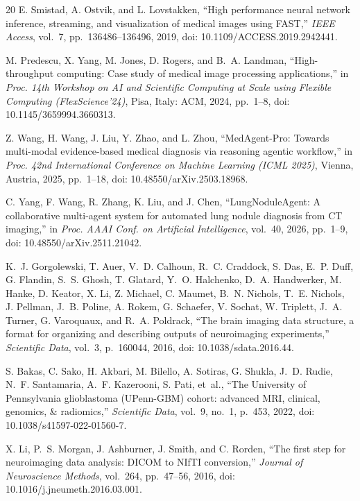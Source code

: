 \documentclass[conference]{IEEEtran}
\begin{document}
\begin{thebibliography}{20}
 E. Smistad, A. Ostvik, and L. Lovstakken, ``High performance neural network inference, streaming, and visualization of medical images using FAST,'' \textit{IEEE Access}, vol.~7, pp.~136486--136496, 2019, doi: 10.1109/ACCESS.2019.2942441.

 M. Predescu, X. Yang, M. Jones, D. Rogers, and B.~A. Landman, ``High-throughput computing: Case study of medical image processing applications,'' in \textit{Proc. 14th Workshop on AI and Scientific Computing at Scale using Flexible Computing (FlexScience'24)}, Pisa, Italy: ACM, 2024, pp.~1--8, doi: 10.1145/3659994.3660313.

 Z. Wang, H. Wang, J. Liu, Y. Zhao, and L. Zhou, ``MedAgent-Pro: Towards multi-modal evidence-based medical diagnosis via reasoning agentic workflow,'' in \textit{Proc. 42nd International Conference on Machine Learning (ICML 2025)}, Vienna, Austria, 2025, pp.~1--18, doi: 10.48550/arXiv.2503.18968.

 C. Yang, F. Wang, R. Zhang, K. Liu, and J. Chen, ``LungNoduleAgent: A collaborative multi-agent system for automated lung nodule diagnosis from CT imaging,'' in \textit{Proc. AAAI Conf. on Artificial Intelligence}, vol.~40, 2026, pp.~1--9, doi: 10.48550/arXiv.2511.21042.

 K.~J. Gorgolewski, T. Auer, V.~D. Calhoun, R.~C. Craddock, S. Das, E.~P. Duff, G. Flandin, S.~S. Ghosh, T. Glatard, Y.~O. Halchenko, D.~A. Handwerker, M. Hanke, D. Keator, X. Li, Z. Michael, C. Maumet, B.~N. Nichols, T.~E. Nichols, J. Pellman, J.~B. Poline, A. Rokem, G. Schaefer, V. Sochat, W. Triplett, J.~A. Turner, G. Varoquaux, and R.~A. Poldrack, ``The brain imaging data structure, a format for organizing and describing outputs of neuroimaging experiments,'' \textit{Scientific Data}, vol.~3, p.~160044, 2016, doi: 10.1038/sdata.2016.44.

 S. Bakas, C. Sako, H. Akbari, M. Bilello, A. Sotiras, G. Shukla, J.~D. Rudie, N.~F. Santamaria, A.~F. Kazerooni, S. Pati, et~al., ``The University of Pennsylvania glioblastoma (UPenn-GBM) cohort: advanced MRI, clinical, genomics, \& radiomics,'' \textit{Scientific Data}, vol.~9, no.~1, p.~453, 2022, doi: 10.1038/s41597-022-01560-7.

 X. Li, P.~S. Morgan, J. Ashburner, J. Smith, and C. Rorden, ``The first step for neuroimaging data analysis: DICOM to NIfTI conversion,'' \textit{Journal of Neuroscience Methods}, vol.~264, pp.~47--56, 2016, doi: 10.1016/j.jneumeth.2016.03.001.


\end{thebibliography}
\end{document}
